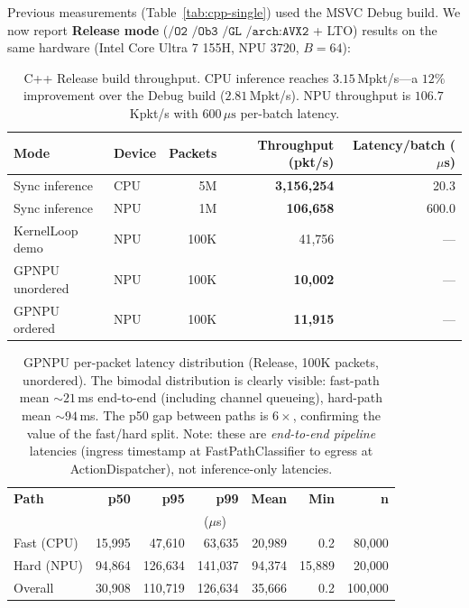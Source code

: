 \documentclass[11pt,a4paper,twoside]{article}
\theoremstyle{definition}
\theoremstyle{remark}
\begin{document}
Previous measurements (Table~\ref{tab:cpp-single}) used the MSVC Debug build. We now report \textbf{Release mode} ($\texttt{/O2 /Ob3 /GL /arch:AVX2}$ + LTO) results on the same hardware (Intel Core Ultra 7 155H, NPU 3720, $B{=}64$):

\begin{table}[H]
\centering
\small
\begin{tabular}{llrrr}
\toprule
\textbf{Mode} & \textbf{Device} & \textbf{Packets} & \textbf{Throughput (pkt/s)} & \textbf{Latency/batch ($\mu$s)} \\
\midrule
Sync inference   & CPU & 5M  & \textbf{3{,}156{,}254} & 20.3 \\
Sync inference   & NPU & 1M  & \textbf{106{,}658}     & 600.0 \\
KernelLoop demo  & NPU & 100K & 41{,}756              & --- \\
\midrule
GPNPU unordered  & NPU & 100K & \textbf{10{,}002}     & --- \\
GPNPU ordered    & NPU & 100K & \textbf{11{,}915}     & --- \\
\bottomrule
\end{tabular}
\caption{C++ Release build throughput. CPU inference reaches $3.15$\,Mpkt/s---a $12\%$ improvement over the Debug build ($2.81$\,Mpkt/s). NPU throughput is $106.7$\,Kpkt/s with $600\,\mu\text{s}$ per-batch latency.}
\label{tab:release-bench}
\end{table}

\begin{table}[H]
\centering
\small
\begin{tabular}{lrrrrrr}
\toprule
\textbf{Path} & \textbf{p50} & \textbf{p95} & \textbf{p99} & \textbf{Mean} & \textbf{Min} & \textbf{n} \\
 & \multicolumn{5}{c}{($\mu$s)} & \\
\midrule
Fast (CPU)  & 15{,}995 & 47{,}610 & 63{,}635 & 20{,}989 & 0.2 & 80{,}000 \\
Hard (NPU)  & 94{,}864 & 126{,}634 & 141{,}037 & 94{,}374 & 15{,}889 & 20{,}000 \\
Overall     & 30{,}908 & 110{,}719 & 126{,}634 & 35{,}666 & 0.2 & 100{,}000 \\
\bottomrule
\end{tabular}
\caption{GPNPU per-packet latency distribution (Release, 100K packets, unordered). The bimodal distribution is clearly visible: fast-path mean ${\sim}21$\,ms end-to-end (including channel queueing), hard-path mean ${\sim}94$\,ms. The p50 gap between paths is $6\times$, confirming the value of the fast/hard split. Note: these are \emph{end-to-end pipeline} latencies (ingress timestamp at FastPathClassifier to egress at ActionDispatcher), not inference-only latencies.}
\label{tab:gpnpu-latency}
\end{table}
\end{document}

